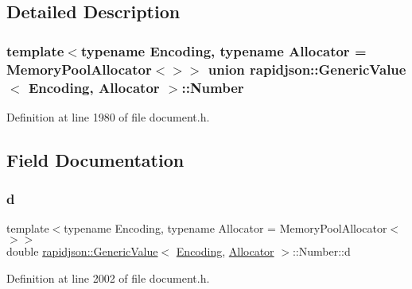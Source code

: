 \subsection{Detailed Description}
\subsubsection*{template$<$typename Encoding, typename Allocator = Memory\+Pool\+Allocator$<$$>$$>$\newline
union rapidjson\+::\+Generic\+Value$<$ Encoding, Allocator $>$\+::\+Number}



Definition at line 1980 of file document.\+h.



\subsection{Field Documentation}
\mbox{\label{unionrapidjson_1_1_generic_value_1_1_number_ad242939291f02654c8ab41ee76769774}} 
\subsubsection{\texorpdfstring{d}{d}}
{\footnotesize\ttfamily template$<$typename Encoding, typename Allocator = Memory\+Pool\+Allocator$<$$>$$>$ \\
double \mbox{\hyperlink{classrapidjson_1_1_generic_value}{rapidjson\+::\+Generic\+Value}}$<$ \mbox{\hyperlink{classrapidjson_1_1_encoding}{Encoding}}, \mbox{\hyperlink{classrapidjson_1_1_allocator}{Allocator}} $>$\+::Number\+::d}



Definition at line 2002 of file document.\+h.

\mbox{\label{unionrapidjson_1_1_generic_value_1_1_number_abf0b096b8d93d4edbb7d5f5f211b3045}} 
